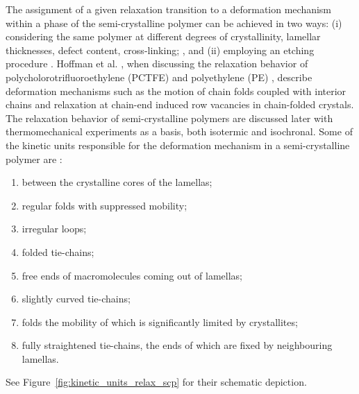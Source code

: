The assignment of a given relaxation transition to a deformation mechanism within a phase of the semi-crystalline polymer can be achieved in two ways: (i) considering the same polymer at different degrees of crystallinity, lamellar thicknesses, defect content, cross-linking; \citep{ferryViscoelasticPropertiesPolymers1980}, and (ii) employing an etching procedure \citep{arzhakovRelaxationPhysicalMechanical2019}.
Hoffman et al. \citep{hoffmanAnalysisRelaxationsPolychlorotrifluoroethylene2007}, when discussing the relaxation behavior of polycholorotrifluoroethylene (PCTFE)   and polyethylene (PE)  , describe deformation mechanisms such as the motion of chain folds coupled with interior chains and relaxation at chain-end induced row vacancies in chain-folded crystals.
The relaxation behavior of semi-crystalline polymers are discussed later with thermomechanical experiments as a basis, both isotermic and isochronal.
Some of the kinetic units responsible for the deformation mechanism in a semi-crystalline polymer are \citep{arzhakovRelaxationPhysicalMechanical2019}:
\begin{enumerate}
	\item between the crystalline cores of the lamellas;
	\item regular folds with suppressed mobility;
	\item irregular loops;
	\item folded tie-chains;
	\item free ends of macromolecules coming out of lamellas;
	\item slightly curved tie-chains;
	\item folds the mobility of which is significantly limited by crystallites;
	\item fully straightened tie-chains, the ends of which are fixed by neighbouring lamellas.
\end{enumerate}
See Figure~\ref{fig:kinetic_units_relax_scp} for their schematic depiction.
